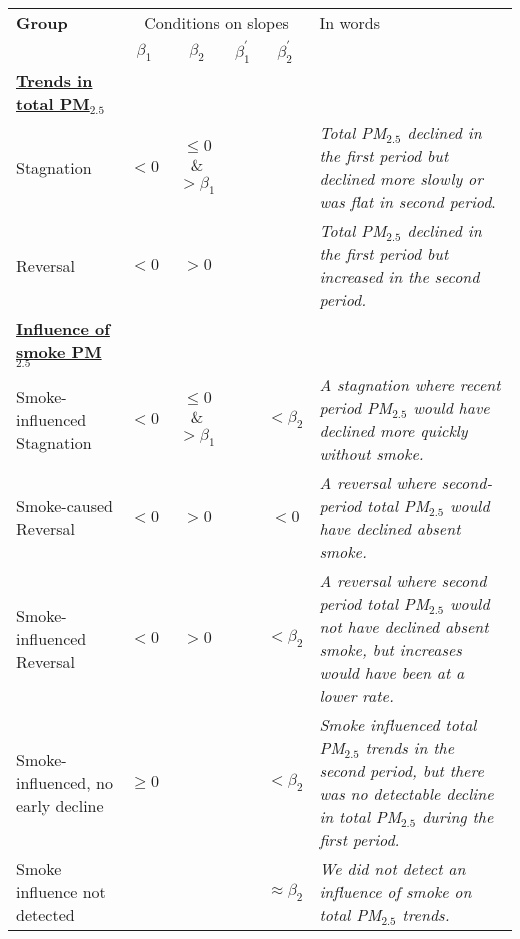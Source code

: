 \documentclass{article}
\begin{document}
\thispagestyle{empty}



\begin{table}[]
    \centering
    \hspace*{-2cm}
    \begin{tabular}{l|c|c|c|c|p{4cm}}
         \textbf{Group} &  \multicolumn{4}{c}{\textbf{}{Conditions on slopes} } & \textbf{}{In words} \\
         & $\beta_1$ & $\beta_2$ & $\beta^\prime_1$ & $\beta^\prime_2$ & \\ 
         \hline 
        \rule{0pt}{2ex} \underline{\textbf{Trends in total PM$_{2.5}$}} &&&&& \\
       \rule{0pt}{2ex} Stagnation   & $<0$ & $\leq0$ \& $> \beta_1$ &  & & \emph{Total PM$_{2.5}$ declined in the first period but declined more slowly or was flat in second period}. \\ [5pt]
       \rule{0pt}{2ex} Reversal   & $<0$ & $>0$ && & \emph{Total PM$_{2.5}$ declined in the first period but increased in the second period.} \\
        \rule{0pt}{4ex} \underline{\textbf{Influence of smoke PM$_{2.5}$}} &&&&& \\
       \rule{0pt}{2ex} Smoke-influenced Stagnation  & $<0$ & $\leq0$ \& $> \beta_1$ &  & $< \beta_2$ & \emph{A stagnation where recent period PM$_{2.5}$ would have declined more quickly without smoke.} \\
       \rule{0pt}{2ex} Smoke-caused Reversal   & $<0$ & $>0$ &  & $<0$ & \emph{A reversal where second-period total PM$_{2.5}$ would have declined absent smoke.} \\
       \rule{0pt}{2ex} Smoke-influenced Reversal  & $<0$ & $>0$ &  & $<\beta_2$ & \emph{A reversal where second period total PM$_{2.5}$ would not have declined absent smoke, but increases would have been at a lower rate.}\\
       \rule{0pt}{2ex} Smoke-influenced, no early decline  & $\geq 0$ &  &  & $<\beta_2 $ & \emph{Smoke influenced total PM$_{2.5}$ trends in the second period, but there was no detectable decline in total PM$_{2.5}$ during the first period.} \\
       \rule{0pt}{2ex} Smoke influence not detected  &  &  &  & $\approx \beta_2$ & \emph{We did not detect an influence of smoke on total PM$_{2.5}$ trends.} \\
       \hline
    \end{tabular}
    \label{tab:groupings}
\end{table}
\end{document}
